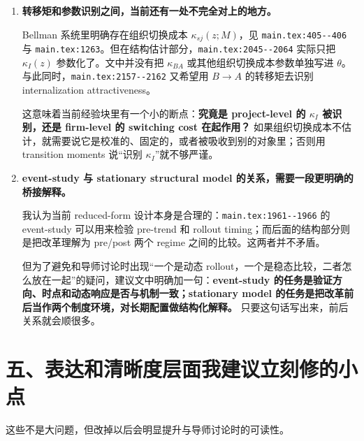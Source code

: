 \documentclass[12pt]{ctexart}
\newcommand{\fileref}[1]{\nolinkurl{#1}}
\begin{document}
\begin{enumerate}
\item \textbf{转移矩和参数识别之间，当前还有一处不完全对上的地方。}

Bellman 系统里明确存在组织切换成本 $\kappa_{sj}(z;M)$，见 \fileref{main.tex:405--406} 与 \fileref{main.tex:1263}。但在结构估计部分，\fileref{main.tex:2045--2064} 实际只把 $\kappa_I(z)$ 参数化了。文中并没有把 $\kappa_{BA}$ 或其他组织切换成本参数单独写进 $\theta$。与此同时，\fileref{main.tex:2157--2162} 又希望用 $B\rightarrow A$ 的转移矩去识别 internalization attractiveness。

这意味着当前经验块里有一个小的断点：\textbf{究竟是 project-level 的 $\kappa_I$ 被识别，还是 firm-level 的 switching cost 在起作用？} 如果组织切换成本不估计，就需要说它是校准的、固定的，或者被吸收到别的对象里；否则用 transition moments 说“识别 $\kappa_I$”就不够严谨。

\item \textbf{event-study 与 stationary structural model 的关系，需要一段更明确的桥接解释。}

我认为当前 reduced-form 设计本身是合理的：\fileref{main.tex:1961--1966} 的 event-study 可以用来检验 pre-trend 和 rollout timing；而后面的结构部分则是把改革理解为 pre/post 两个 regime 之间的比较。这两者并不矛盾。

但为了避免和导师讨论时出现“一个是动态 rollout，一个是稳态比较，二者怎么放在一起”的疑问，建议文中明确加一句：\textbf{event-study 的任务是验证方向、时点和动态响应是否与机制一致；stationary model 的任务是把改革前后当作两个制度环境，对长期配置做结构化解释。} 只要这句话写出来，前后关系就会顺很多。
\end{enumerate}

\section*{五、表达和清晰度层面我建议立刻修的小点}

这些不是大问题，但改掉以后会明显提升与导师讨论时的可读性。
\end{document}
